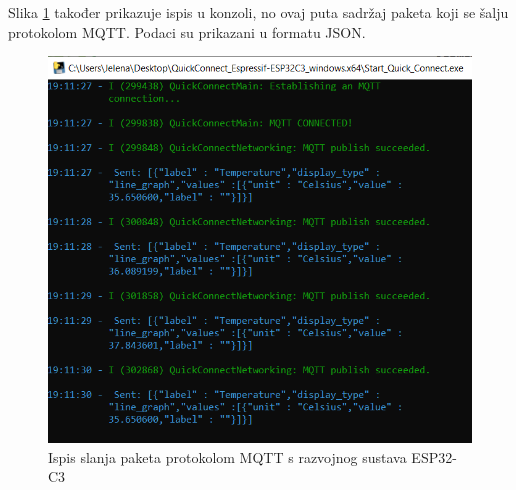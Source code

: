 Slika \ref{fig:esp32_easy_connect_mqtt_packages} također prikazuje ispis u konzoli, no ovaj puta sadržaj paketa koji se šalju protokolom MQTT. Podaci su prikazani u formatu JSON.

\begin{figure}[ht]
	\centering
	\includegraphics[scale=0.5]{imgs/esp32_easy_connect_mqtt_packages}
	\caption{Ispis slanja paketa protokolom MQTT s razvojnog sustava ESP32-C3}
	\label{fig:esp32_easy_connect_mqtt_packages}
\end{figure}

\eject
